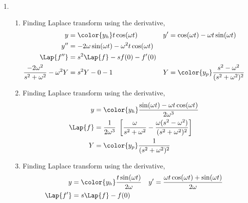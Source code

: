 \begin{enumerate}
    \item
          \begin{enumerate}
              \item Finding Laplace transform using the derivative,
                    \begin{align}
                        y            & = \color{y_h} t\cos(\omega t)             &
                        y'           & = \cos(\omega t) -\omega t \sin(\omega t)   \\
                        y''          & = -2\omega \sin(\omega t) -\omega^2 t
                        \cos(\omega t)                                             \\
                        \Lap\{f''\}  & = s^2\Lap\{f\} - sf(0) - f'(0)              \\
                        \frac{-2\omega^2}
                        {s^2 + \omega^2}
                        - \omega^2 Y & = s^2Y - 0 - 1                            &
                        Y            & = \color{y_p}\frac{s^2-\omega^2}
                        {(s^2 + \omega^2)^2}
                    \end{align}
              \item Finding Laplace transform using the derivative,
                    \begin{align}
                        y         & = \color{y_h} \frac{\sin(\omega t)
                            - \omega t\cos(\omega t)}
                        {2\omega^3}                                                \\
                        \Lap\{f\} & = \frac{1}{2\omega^3}\ \left[
                            \frac{\omega}{s^2 + \omega^2}
                        - \frac{\omega(s^2 - \omega^2)}{(s^2 + \omega^2)^2}\right] \\
                        Y         & = \color{y_p}\frac{1}
                        {(s^2 + \omega^2)^2}
                    \end{align}
              \item Finding Laplace transform using the derivative,
                    \begin{align}
                        y                    & = \color{y_h} \frac{t\sin(\omega t)}
                        {2\omega}            &
                        y'                   & = \frac{\omega t \cos(\omega t) +
                        \sin(\omega t)}{2\omega}                                    \\
                        \Lap\{f'\}           & = s\Lap\{f\} - f(0)                  \\

\end{align}
\end{enumerate}
\end{enumerate}
